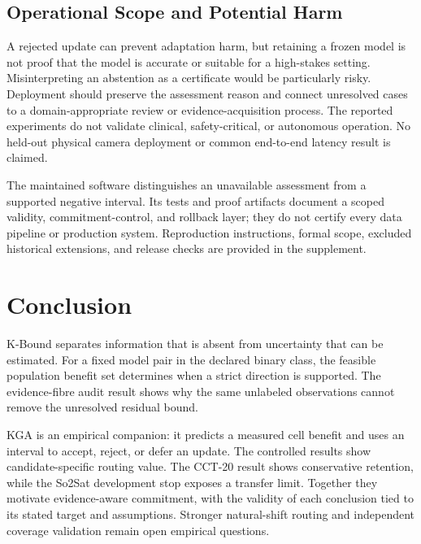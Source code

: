 \subsection{Operational Scope and Potential Harm}

A rejected update can prevent adaptation harm, but retaining a frozen model is not proof that the
model is accurate or suitable for a high-stakes setting. Misinterpreting an abstention as a
certificate would be particularly risky. Deployment should preserve the assessment reason and
connect unresolved cases to a domain-appropriate review or evidence-acquisition process.
The reported experiments do not validate clinical, safety-critical, or autonomous operation.
No held-out physical camera deployment or common end-to-end latency result is claimed.

The maintained software distinguishes an unavailable assessment from a supported negative interval.
Its tests and proof artifacts document a scoped validity, commitment-control, and rollback layer;
they do not certify every data pipeline or production system. Reproduction instructions, formal
scope, excluded historical extensions, and release checks are provided in the supplement.

\section{Conclusion}
\label{sec:compact-conclusion}

K-Bound separates information that is absent from uncertainty that can be estimated.
For a fixed model pair in the declared binary class, the feasible population benefit set determines
when a strict direction is supported. The evidence-fibre audit result shows why the same unlabeled
observations cannot remove the unresolved residual bound.

KGA is an empirical companion: it predicts a measured cell benefit and uses an interval to accept,
reject, or defer an update. The controlled results show candidate-specific routing value.
The CCT-20 result shows conservative retention, while the So2Sat development stop exposes a transfer
limit. Together they motivate evidence-aware commitment, with the validity of each conclusion tied
to its stated target and assumptions. Stronger natural-shift routing and independent coverage
validation remain open empirical questions.
